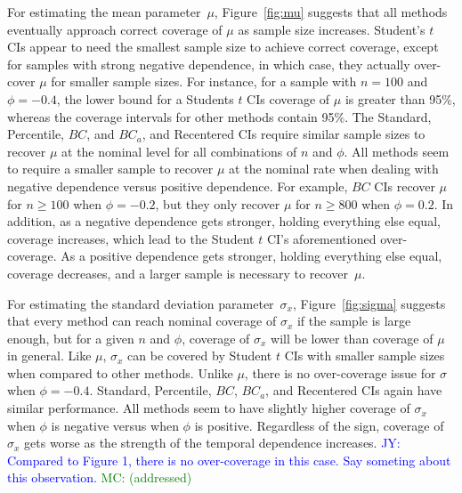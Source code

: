 \documentclass[12pt, letterpaper, titlepage]{article}
\newcommand{\jy}[1]{\textcolor{blue}{JY: #1}}
\newcommand{\mc}[1]{\textcolor{green}{MC: (#1)}}
\begin{document}
For estimating the mean parameter~$\mu$, Figure~\ref{fig:mu} suggests that all
methods eventually approach correct coverage of $\mu$ as sample size
increases. Student's $t$ CIs appear to need the smallest sample size
to achieve correct coverage, except for samples with strong negative
dependence, in which case, they actually over-cover $\mu$ for smaller sample
sizes. For instance, for a sample with $n = 100$ and $\phi = -0.4$, the lower
bound for a Students $t$ CIs coverage of $\mu$ is greater than 95\%, whereas
the coverage intervals for other methods contain 95\%. The Standard,
Percentile, $BC$, and $BC_a$, and Recentered CIs require similar sample
sizes to recover $\mu$ at the nominal level for all combinations of $n$ and
$\phi$. All methods seem to require a smaller sample to recover $\mu$ at the
nominal rate when dealing with negative dependence versus positive dependence.
For example, $BC$ CIs recover $\mu$ for $n \geq 100$ when $\phi = -0.2$, but
they only recover $\mu$ for $n \geq 800$ when $\phi = 0.2$. In addition, as a
negative dependence gets stronger, holding everything else equal, coverage
increases, which lead to the Student $t$ CI's aforementioned over-coverage. As
a positive dependence gets stronger, holding everything else equal, coverage
decreases, and a larger sample is necessary to recover~$\mu$.


For estimating the standard deviation parameter~$\sigma_x$,
Figure~\ref{fig:sigma} suggests that every method can reach nominal coverage of
$\sigma_x$ if the sample is large enough, but for a given $n$ and $\phi$,
coverage of $\sigma_x$ will be lower than coverage of $\mu$ in general. Like
$\mu$, $\sigma_x$ can be covered by Student $t$ CIs with smaller sample sizes
when compared to other methods. Unlike $\mu$, there is no over-coverage issue for
$\sigma$ when $\phi = -0.4$. Standard, Percentile, $BC$, $BC_a$, and Recentered
CIs again have similar performance. All methods seem to have slightly higher
coverage of $\sigma_x$ when $\phi$ is negative versus when $\phi$ is positive.
Regardless of the sign, coverage of $\sigma_x$ gets worse as the strength of
the temporal dependence increases.
\jy{Compared to Figure 1, there is no over-coverage in this case. Say someting
  about this observation.} \mc{addressed}
\end{document}
